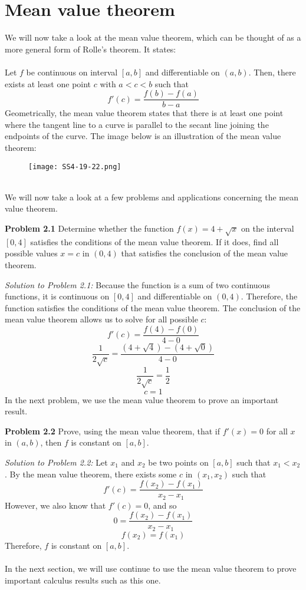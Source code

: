 \documentclass[11pt]{scrartcl}
\begin{document}
\section{Mean value theorem}
\noindent
We will now take a look at the mean value theorem, which can be thought of as a more general form of Rolle's theorem. It states:\\
\\
\noindent 
Let $f$ be continuous on interval $[a,b]$ and differentiable on $(a,b)$. Then, there exists at least one point $c$ with $a<c<b$ such that 
$$f'(c) = \frac{f(b)-f(a)}{b-a}$$
\noindent 
Geometrically, the mean value theorem states that there is at least one point where the tangent line to a curve is parallel to the secant line joining the endpoints of the curve.
The image below is an illustration of the mean value theorem:  
\begin{figure}[htp]
    \centering
    \texttt{[image: SS4-19-22.png]}
\end{figure}\\
\noindent
We will now take a look at a few problems and applications concerning the mean value theorem. 
\begin{tcolorbox}
[colback=purple!5!white,colframe=purple!75!black]
\textbf{Problem 2.1} Determine whether the function $f(x)=4+\sqrt{x}$ on the interval $[0,4]$ satisfies the conditions of the mean value theorem. If it does, find all possible values $x=c$ in $(0,4)$ that satisfies the conclusion of the mean value theorem.  
\end{tcolorbox}
\noindent
\textit{Solution to Problem 2.1:} Because the function is a sum of two continuous functions, it is continuous on $[0,4]$ and differentiable on $(0,4)$. Therefore, the function satisfies the conditions of the mean value theorem. The conclusion of the mean value theorem allows us to solve for all possible $c$:  
$$f'(c)=\frac{f(4)-f(0)}{4-0}$$
$$\frac{1}{2\sqrt{c}}=\frac{(4+\sqrt{4})-(4+\sqrt{0})}{4-0}$$
$$\frac{1}{2\sqrt{c}}=\frac{1}{2}$$
$$c=1$$ 
\noindent 
In the next problem, we use the mean value theorem to prove an important result. 
\begin{tcolorbox}
[colback=purple!5!white,colframe=purple!75!black]
\textbf{Problem 2.2} Prove, using the mean value theorem, that if $f'(x)=0$ for all $x$ in $(a,b)$, then $f$ is constant on $[a,b]$. 
\end{tcolorbox}
\noindent 
\textit{Solution to Problem 2.2:} Let $x_1$ and $x_2$ be two points on $[a,b]$ such that $x_1<x_2$. By the mean value theorem, there exists some $c$ in $(x_1, x_2)$ such that 
$$f'(c)=\frac{f(x_2)-f(x_1)}{x_2-x_1}$$
\noindent 
However, we also know that $f'(c)=0$, and so 
$$0=\frac{f(x_2)-f(x_1)}{x_2-x_1}$$
$$f(x_2)=f(x_1)$$
\noindent 
Therefore, $f$ is constant on $[a,b]$. \\
\\
\noindent 
In the next section, we will use continue to use the mean value theorem to prove important calculus results such as this one. 
\end{document}
